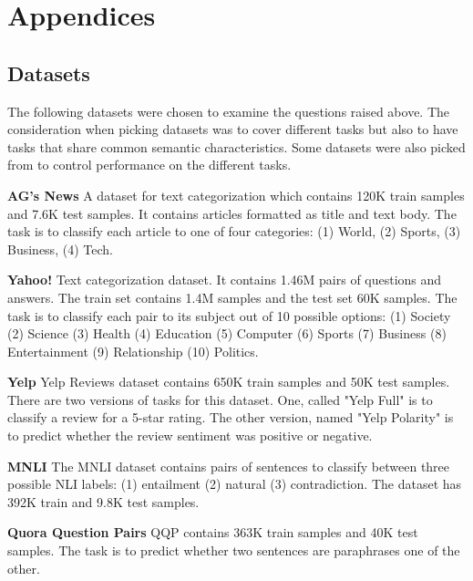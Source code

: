 \documentclass[11pt,a4paper]{article}
\begin{document}
\nocite{*}



\appendix


\section{Appendices}
\label{sec:appendix}

\subsection{Datasets}
\label{apx:datasets}
The following datasets were chosen to examine the questions raised above.
The consideration when picking datasets was to cover different tasks but also to have tasks that share common semantic characteristics. 
Some datasets were also picked from \citet{schick2020exploiting} to control performance on the different tasks.

\vspace{8pt}
\noindent \textbf{AG's News} \quad
A dataset for text categorization which contains 120K train samples and 7.6K test samples.
It contains articles formatted as title and text body.
The task is to classify each article to one of four categories: (1) World, (2) Sports, (3) Business, (4) Tech.

\vspace{8pt}
\noindent \textbf{Yahoo!} \quad
Text categorization dataset. It contains 1.46M pairs of questions and answers.
The train set contains 1.4M samples and the test set 60K samples.
The task is to classify each pair to its subject out of 10 possible options: (1) Society (2) Science (3) Health (4) Education (5) Computer (6) Sports (7) Business (8) Entertainment (9) Relationship (10) Politics.

\vspace{8pt}
\noindent \textbf{Yelp} \quad
Yelp Reviews dataset contains 650K train samples and 50K test samples.
There are two versions of tasks for this dataset.
One, called "Yelp Full" is to classify a review for a 5-star rating.
The other version, named "Yelp Polarity" is to predict whether the review sentiment was positive or negative.

\vspace{8pt}
\noindent \textbf{MNLI} \quad
The MNLI dataset contains pairs of sentences to classify between three possible NLI labels: (1) entailment (2) natural (3) contradiction. 
The dataset has 392K train and 9.8K test samples.

\vspace{8pt}
\noindent \textbf{Quora Question Pairs} \quad
QQP contains 363K train samples and 40K test samples.
The task is to predict whether two sentences are paraphrases one of the other.
\end{document}
